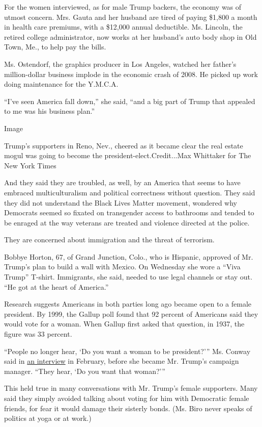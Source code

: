 For the women interviewed, as for male Trump backers, the economy was of
utmost concern. Mrs. Gauta and her husband are tired of paying \$1,800 a
month in health care premiums, with a \$12,000 annual deductible. Ms.
Lincoln, the retired college administrator, now works at her husband's
auto body shop in Old Town, Me., to help pay the bills.

Ms. Ostendorf, the graphics producer in Los Angeles, watched her
father's million-dollar business implode in the economic crash of 2008.
He picked up work doing maintenance for the Y.M.C.A.

``I've seen America fall down,'' she said, ``and a big part of Trump
that appealed to me was his business plan.''

Image

Trump's supporters in Reno, Nev., cheered as it became clear the real
estate mogul was going to become the president-elect.Credit...Max
Whittaker for The New York Times

And they said they are troubled, as well, by an America that seems to
have embraced multiculturalism and political correctness without
question. They said they did not understand the Black Lives Matter
movement, wondered why Democrats seemed so fixated on transgender access
to bathrooms and tended to be enraged at the way veterans are treated
and violence directed at the police.

They are concerned about immigration and the threat of terrorism.

Bobbye Horton, 67, of Grand Junction, Colo., who is Hispanic, approved
of Mr. Trump's plan to build a wall with Mexico. On Wednesday she wore a
``Viva Trump'' T-shirt. Immigrants, she said, needed to use legal
channels or stay out. ``He got at the heart of America.''

Research suggests Americans in both parties long ago became open to a
female president. By 1999, the Gallup poll found that 92 percent of
Americans said they would vote for a woman. When Gallup first asked that
question, in 1937, the figure was 33 percent.

``People no longer hear, `Do you want a woman to be president?''' Ms.
Conway said in
\href{http://www.nytimes.com/2016/02/17/us/hillary-clintons-candidacy-reveals-generational-schism-among-women.html}{an
interview} in February, before she became Mr. Trump's campaign manager.
``They hear, `Do you want that woman?'''

This held true in many conversations with Mr. Trump's female supporters.
Many said they simply avoided talking about voting for him with
Democratic female friends, for fear it would damage their sisterly
bonds. (Ms. Biro never speaks of politics at yoga or at work.)

